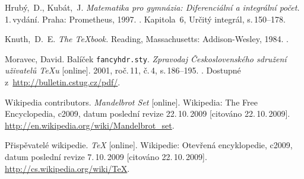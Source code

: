 \documentclass{vskpou} %
\begin{document}
\begin{thebibliography}{9}

 Hrubý,~D., Kubát,~J. \textit{Matematika pro gymnázia: Diferenciální a integrální počet.} 1.\,vydání. Praha: Prometheus, 1997. . Kapitola~6, Určitý integrál, s.\,150--178.

 Knuth,~D.~E. \textit{The \TeX book.} Reading, Massachusetts: Addison-Wesley, 1984. .

 Moravec, David. Balíček \texttt{fancyhdr.sty}. \textit{Zpravodaj Československého sdružení uživatelů \TeX u} [online]. 2001, roč.\,11, č.\,4, s.\,186--195. . Dostupné z~\url{http://bulletin.cstug.cz/pdf/}.

 Wikipedia contributors. \textit{Mandelbrot Set} [online]. Wikipedia: The Free Encyclopedia, c2009, datum poslední revize 22.\,10.\,2009 [citováno 22.\,10.\,2009].
\url{http://en.wikipedia.org/wiki/Mandelbrot_set}.

 Přispěvatelé wikipedie. \textit{\TeX} [online]. Wikipedie: Otevřená encyklopedie, c2009, datum poslední revize 7.\,10.\,2009 [citováno 22.\,10.\,2009].
\url{http://cs.wikipedia.org/wiki/TeX}.

\end{thebibliography}
\end{document}
